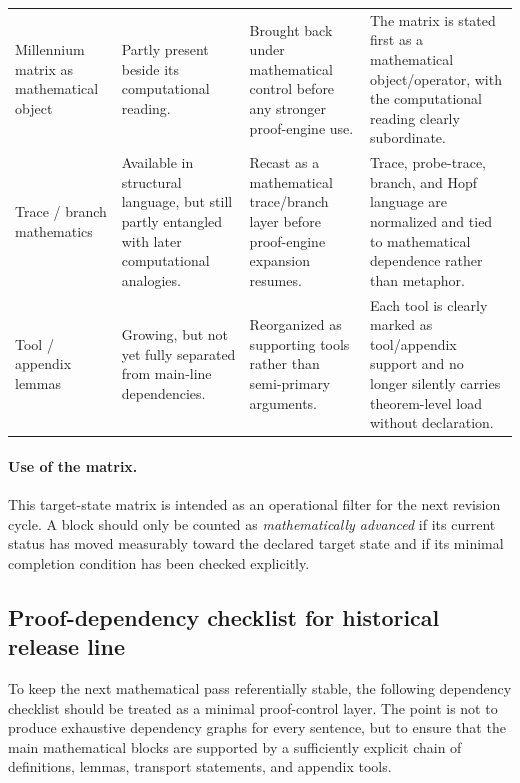 \documentclass[12pt,a4paper]{article}
\DeclareRobustCommand{\QSCver}[1]{archival stage}
\renewcommand{\QSCver}[1]{historical release line}
\begin{document}
\begin{longtable}{P{0.22\textwidth}P{0.17\textwidth}P{0.24\textwidth}P{0.25\textwidth}}
Millennium matrix as mathematical object & Partly present beside its computational reading. & Brought back under mathematical control before any stronger proof-engine use. & The matrix is stated first as a mathematical object/operator, with the computational reading clearly subordinate. \\

Trace / branch mathematics & Available in structural language, but still partly entangled with later computational analogies. & Recast as a mathematical trace/branch layer before proof-engine expansion resumes. & Trace, probe-trace, branch, and Hopf language are normalized and tied to mathematical dependence rather than metaphor. \\

Tool / appendix lemmas & Growing, but not yet fully separated from main-line dependencies. & Reorganized as supporting tools rather than semi-primary arguments. & Each tool is clearly marked as tool/appendix support and no longer silently carries theorem-level load without declaration. \\
\bottomrule
\end{longtable}

\paragraph{Use of the matrix.}
This target-state matrix is intended as an operational filter for the next revision cycle. A block should only be counted as \emph{mathematically advanced} if its current status has moved measurably toward the declared target state and if its minimal completion condition has been checked explicitly.

\subsection*{Proof-dependency checklist for \QSCver{v2.27.0}}
To keep the next mathematical pass referentially stable, the following dependency checklist should be treated as a minimal proof-control layer. The point is not to produce exhaustive dependency graphs for every sentence, but to ensure that the main mathematical blocks are supported by a sufficiently explicit chain of definitions, lemmas, transport statements, and appendix tools.
\end{document}
